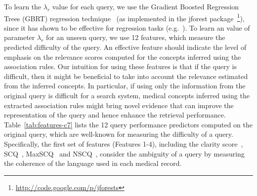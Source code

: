 \documentclass[1p]{elsarticle}
\begin{document}
To learn the $\lambda_r$ value for each query, we use the Gradient Boosted Regression Trees (GBRT) regression technique~\cite{tyree2011www} (as implemented in the jforest package~\cite{ganjisaffar2011sigir}\footnote{\url{http://code.google.com/p/jforests}}), since it has shown to be effective for regression tasks (e.g.~\cite{limsopatham2013sigir}). To learn an value of parameter $\lambda_r$ for an unseen query, we use 12 features, which measure the predicted difficulty of the query. An effective feature should indicate the level of emphasis on the relevance scores computed for the concepts inferred using the association rules. Our intuition for using these features is that if the query is difficult, then it might be beneficial to take into account the relevance estimated from the inferred concepts. In particular, if using only the information from the original query is difficult for a search system, medical concepts inferred using the extracted association rules might bring novel evidence that can improve the representation of the query and hence enhance the retrieval performance. 
% 
Table~\ref{tab:features-c7} lists the 12 query performance predictors computed on the original query, which are well-known for measuring the difficulty of a query. 
Specifically, the first set of features (Features 1-4), including the clarity score~\cite{cronen-townsend2002sigir}, SCQ~\cite{zhao2008ecir}, MaxSCQ~\cite{zhao2008ecir} and NSCQ~\cite{zhao2008ecir}, consider the ambiguity of a query by measuring the coherence of the language used in each medical record. 
\end{document}
